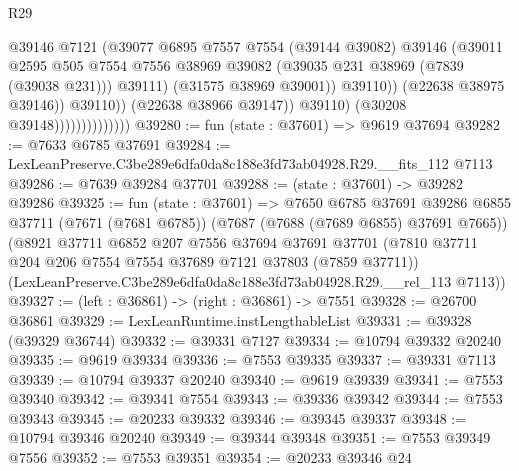 \begin{lexlean}{R29}
\begin{coremodule}
                                            @39146
                                            @7121
                                            (@39077
                                              @6895
                                              @7557
                                              @7554
                                              (@39144 @39082)
                                              @39146
                                              (@39011
                                                @2595
                                                @505
                                                @7554
                                                @7556
                                                @38969
                                                @39082
                                                (@39035 @231 @38969 (@7839 (@39038 @231)))
                                                @39111)
                                              (@31575 @38969 @39001))
                                            @39110))
                                        (@22638 @38975 @39146))
                                      @39110))
                                  (@22638 @38966 @39147))
                                @39110)
                              (@30208 @39148))))))))))))))
@39280 := fun (state : @37601) => @9619 @37694
@39282 := @7633 @6785 @37691
@39284 := LexLeanPreserve.C3be289e6dfa0da8c188e3fd73ab04928.R29.__fits_112 @7113
@39286 := @7639 @39284 @37701
@39288 := (state : @37601) -> @39282 @39286
@39325 := fun (state : @37601) =>
  @7650
    @6785
    @37691
    @39286
    @6855
    @37711
    (@7671 (@7681 @6785))
    (@7687 (@7688 (@7689 @6855) @37691 @7665))
    (@8921
      @37711
      @6852
      @207
      @7556
      @37694
      @37691
      @37701
      (@7810 @37711 @204 @206 @7554 @7554 @37689 @7121 @37803 (@7859 @37711))
      (LexLeanPreserve.C3be289e6dfa0da8c188e3fd73ab04928.R29.__rel_113 @7113))
@39327 := (left : @36861) -> (right : @36861) -> @7551
@39328 := @26700 @36861
@39329 := LexLeanRuntime.instLengthableList
@39331 := @39328 (@39329 @36744)
@39332 := @39331 @7127
@39334 := @10794 @39332 @20240
@39335 := @9619 @39334
@39336 := @7553 @39335
@39337 := @39331 @7113
@39339 := @10794 @39337 @20240
@39340 := @9619 @39339
@39341 := @7553 @39340
@39342 := @39341 @7554
@39343 := @39336 @39342
@39344 := @7553 @39343
@39345 := @20233 @39332
@39346 := @39345 @39337
@39348 := @10794 @39346 @20240
@39349 := @39344 @39348
@39351 := @7553 @39349 @7556
@39352 := @7553 @39351
@39354 := @20233 @39346 @24

\end{coremodule}
\end{lexlean}
